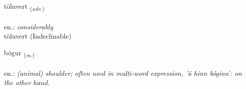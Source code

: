 \documentclass[frontgrid, backgrid]{flacards}\usepackage[]{graphicx}\usepackage[]{xcolor}
\begin{document}

\renewcommand{\flhead}{\vskip5pt \fboxsep=0pt {\small\bfseries\footnotesize Atviksorð | Adverb}}
\renewcommand{\fcfoot}{\vskip5pt \fboxsep=0pt \hspace{2pt}{\small\bfseries\footnotesize 2K}}

\renewcommand{\blhead}{\vskip5pt {\small\bfseries\footnotesize Atviksorð | Adverb }}
\renewcommand{\bcfoot}{\vskip5pt \hspace{2pt}{\small\bfseries\footnotesize 2K}}


{töluvert \small{\textsubscript{(\textit{adv.})}} \\[1ex]
\textphonetic{[tʰœːlʏvɛr̥t]} \\
en.: \emph{considerably} \\  [2ex]
töluvert (Indeclinable)}

\renewcommand{\flhead}{\vskip5pt \fboxsep=0pt {\small\bfseries\footnotesize Nafnorð | Noun}}
\renewcommand{\fcfoot}{\vskip5pt \fboxsep=0pt \hspace{2pt}{\small\bfseries\footnotesize 2K}}

\renewcommand{\blhead}{\vskip5pt {\small\bfseries\footnotesize Nafnorð | Noun }}
\renewcommand{\bcfoot}{\vskip5pt \hspace{2pt}{\small\bfseries\footnotesize 2K}}


{bógur \small{\textsubscript{(\textit{m.})}} \\[1ex] %
\textphonetic{[pouːɣʏr]} \\
en.: \emph{(animal) shoulder; often used in multi-word expression, 'á hinn bóginn': on the other hand.} \\  [2ex]
\renewcommand*{\arraystretch}{0.8}
}
\end{document}
